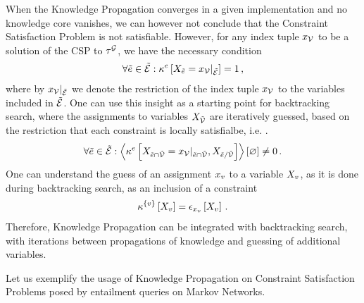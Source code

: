When the Knowledge Propagation  converges in a given implementation and no knowledge core vanishes, we can however not conclude that the Constraint Satisfaction Problem is not satisfiable.
However, for any index tuple $x_{\mathcal{V}}$ to be a solution of the CSP to $\tau^{\mathcal{G}}$, we have the necessary condition
\begin{align*}
    \forall{\tilde{e}\in\tilde{\mathcal{E}}}:{\kappa^{e}\left[X_{\tilde{e}}={x_{\mathcal{V}}}|_{\tilde{\mathcal{E}}}\right]=1} \, ,
\end{align*}
where by ${x_{\mathcal{V}}}|_{\tilde{\mathcal{E}}}$ we denote the restriction of the index tuple $x_{\mathcal{V}}$ to the variables included in $\tilde{\mathcal{E}}$.
One can use this insight as a starting point for backtracking search, where the assignments to variables $X_{\tilde{\mathcal{V}}}$ are iteratively guessed, based on the restriction that each constraint is locally satisfialbe, i.e. .
\begin{align*}
    \forall{\tilde{e}\in\tilde{\mathcal{E}}}:{
        \left\langle \kappa^{e}\left[
            X_{\tilde{e}\cap\tilde{\mathcal{V}}}={x_{\mathcal{V}}}|_{\tilde{e}\cap\tilde{\mathcal{V}}}
            ,X_{\tilde{e}/\tilde{\mathcal{V}}}\right]\right\rangle \left[ \varnothing \right] \neq 0
    } \, .
\end{align*}
One can understand the guess of an assignment $x_{v}$ to a variable $X_{v}$, as it is done during backtracking search, as an inclusion of a constraint
\begin{align*}
    \kappa^{\{v\}}\left[X_{v}\right]
    = \epsilon_{x_{v}}\left[X_{v}\right] \, .
\end{align*}
Therefore, Knowledge Propagation  can be integrated with backtracking search, with iterations between propagations of knowledge and guessing of additional variables.




Let us exemplify the usage of Knowledge Propagation on Constraint Satisfaction Problems posed by entailment queries on Markov Networks.

